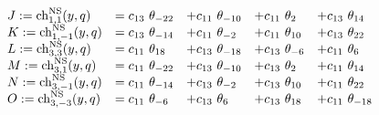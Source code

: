 \begin{equation}
  \begin{array}{lllll}
J := {\rm ch}_{1,1}^{\rm NS}(y,q) &= c_{13}~\theta_{-22} &+
c_{11}~\theta_{-10} &+ c_{11}~\theta_{2} &+ c_{13}~\theta_{14}\\ 
K := {\rm ch}_{1,-1}^{\rm NS}(y,q) &= c_{13}~\theta_{-14} &+
c_{11}~\theta_{-2} &+ c_{11}~\theta_{10} &+ c_{13}~\theta_{22}\\ 
L := {\rm ch}_{3,3}^{\rm NS}(y,q) &= c_{11}~\theta_{18} &+
c_{13}~\theta_{-18} &+ c_{13}~\theta_{-6} &+ c_{11}~\theta_{6}\\ 
M := {\rm ch}_{3,1}^{\rm NS}(y,q) &= c_{11}~\theta_{-22} &+
c_{13}~\theta_{-10} &+ c_{13}~\theta_{2} &+ c_{11}~\theta_{14}\\ 
N := {\rm ch}_{3,-1}^{\rm NS}(y,q) &= c_{11}~\theta_{-14} &+
c_{13}~\theta_{-2} &+ c_{13}~\theta_{10} &+ c_{11}~\theta_{22}\\ 
O := {\rm ch}_{3,-3}^{\rm NS}(y,q) &= c_{11}~\theta_{-6} &+
c_{13}~\theta_{6} &+ c_{13}~\theta_{18} &+ c_{11}~\theta_{-18}
  \end{array}
\end{equation}

